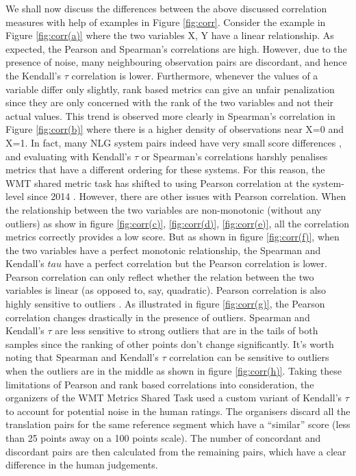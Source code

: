 We shall now discuss the differences between the above discussed correlation measures with help of examples in Figure \ref{fig:corr}. Consider the example in Figure \ref{fig:corr(a)} where the two variables X, Y have a linear relationship. As expected, the Pearson and Spearman's correlations are high. However, due to the presence of noise, many neighbouring observation pairs are discordant, and hence the Kendall's $\tau$ correlation is lower. Furthermore, whenever the values of a variable differ only slightly, rank based metrics can give an unfair penalization since they are only concerned with the rank of the two variables and not their actual values. This trend is observed more clearly in Spearman's correlation in Figure \ref{fig:corr(b)} where there is a higher density of observations near X=0 and X=1. In fact, many NLG system pairs indeed have very small score differences , and evaluating with Kendall's $\tau$ or Spearman's correlations harshly penalises metrics that have a different ordering for these systems. For this reason, the WMT shared metric task has shifted to using Pearson correlation at the system-level since 2014 . However, there are other issues with Pearson correlation. When the relationship between the two variables are non-monotonic (without any outliers) as show in figure \ref{fig:corr(c)}, \ref{fig:corr(d)}, \ref{fig:corr(e)}, all the correlation metrics correctly provides a low score. But as shown in figure \ref{fig:corr(f)}, when the two variables have a perfect monotonic relationship, the Spearman and Kendall's $tau$ have a perfect correlation but the Pearson correlation is lower. Pearson correlation can only reflect whether the relation between the two variables is linear (as opposed to, say, quadratic). Pearson correlation is also highly sensitive to outliers . As illustrated in figure \ref{fig:corr(g)}, the Pearson correlation changes drastically in the presence of outliers. Spearman and Kendall's $\tau$ are less sensitive to strong outliers that are in the tails of both samples since the ranking of other points don't change significantly. It's worth noting that Spearman and Kendall's $\tau$ correlation can be sensitive to outliers when the outliers are in the middle as shown in figure \ref{fig:corr(h)}.  Taking these limitations of Pearson and rank based correlations into consideration, the organizers of the WMT Metrics Shared Task  used a custom variant of Kendall's $\tau$ to account for potential noise in the human ratings. The organisers discard all the translation pairs for the same reference segment which have a “similar” score (less than 25 points away on a 100 points scale). The number of concordant and discordant pairs are then calculated from the remaining pairs, which have a clear difference in the human judgements. \\

